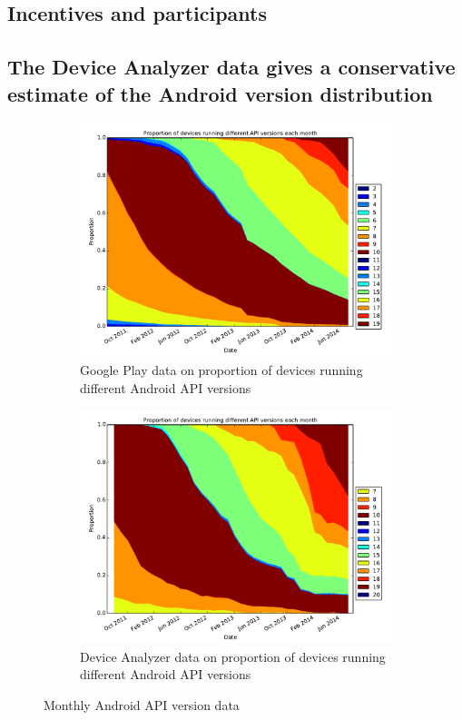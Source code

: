 \documentclass[conference,a4paper,twoside]{IEEEtran}
\begin{document}
\subsection{Incentives and participants}
\label{sec:economics}
\cite{Felt2011}

\subsection{The Device Analyzer data gives a conservative estimate of the Android version distribution}
\label{sec:representative}
\begin{figure}
 \centering
 \begin{subfigure}[b]{\columnwidth}
 \includegraphics[width=\columnwidth]{figures/googleplayapi}
 \caption{Google Play data on proportion of devices running different Android API versions}
 \label{fig:play_api}
\end{subfigure}
\begin{subfigure}[b]{\columnwidth}
 \includegraphics[width=\columnwidth]{figures/norm_api_gpcomp}
 \caption{Device Analyzer data on proportion of devices running different Android API versions}
 \label{fig:da_api}
\end{subfigure}
\caption{Monthly Android API version data}
\end{figure}
\end{document}
